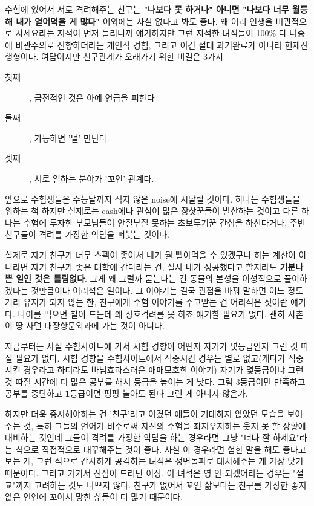 수험에 있어서 서로 격려해주는 친구는
\textbf{"나보다 못 하거나" 아니면 "나보다 너무 월등해 내가 얻어먹을 게 많다"} 이외에는 사실 없다고 봐도 좋다.
왜 이리 인생을 비관적으로 사세요라는 지적이 먼저 들리니까 얘기하지만
그런 지적한 녀석들이 100$\%$ 다 나중에 비관주의로 전향하더라는 개인적 경험, 그리고 이건 절대 과거완료가 아니라 현재진행형이다.
여담이지만 친구관계가 오래가기 위한 비결은 3가지
\begin{description}
    \item [첫째], 금전적인 것은 아예 언급을 피한다
    \item [둘째], 가능하면 '덜' 만난다.
    \item [셋째], 서로 일하는 분야가 '꼬인' 관계다.    
\end{description}
\vspace{5mm}

앞으로 수험생들은 수능날까지 적지 않은 noise에 시달릴 것이다.
하나는 수험생들을 위하는 척 하지만 실제로는 cash에나 관심이 많은 장삿꾼들이 발산하는 것이고
다른 하나는 수험에 투자한 부모님들이 안절부절 못하는 초보투기꾼 간섭을 하신다거나, 주변 친구들이 격려를 가장한 악담을 퍼붓는 것이다.
\vspace{5mm}

실제로 자기 친구가 너무 스펙이 좋아서 내가 뭘 빨아먹을 수 있겠구나 하는 계산이 아니라면
자기 친구가 좋은 대학에 간다라는 건, 설사 내가 성공했다고 할지라도 \textbf{기분나쁜 일인 것은 틀림없다}.
그게 왜 그럴까 묻는다는 건 동물의 본성을 이성적으로 풀이하겠다는 것만큼이나 어리석은 일이다.
그 이야기는 결국 관점을 바꿔 말하면 어느 정도 거리 유지가 되지 않는 한, 친구에게 수험 이야기를 주고받는 건 어리석은 짓이란 얘기다.
나이를 먹으면 철이 드는데 왜 상호격려를 못 하죠 얘기할 필요가 없다. 괜히 사촌이 땅 사면 대장항문외과에 가는 것이 아니다.
\vspace{5mm}

지금부터는 사실 수험사이트에 가서 시험 경향이 어떤지 자기가 몇등급인지 그런 것 따질 필요가 없다.
시험 경향을 수험사이트에서 적중시킨 경우는 별로 없고(게다가 적중시킨 경우라고 하더라도 바넘효과스러운 애매모호한 이야기)
자기가 몇등급이냐 그런 것 따질 시간에 더 많은 공부를 해서 등급을 높이는 게 낫다.
그럼 3등급이면 만족하고 공부를 중단하고 \textbf{1}등급이면 펑펑 놀아도 된다 그런 게 아니지 않은가.
\vspace{5mm}

하지만 더욱 중시해야하는 건 '친구'라고 여겼던 애들이 기대하지 않았던 모습을 보여주는 것,
특히 그들의 언어가 비수로써 자신의 수험을 좌지우지하는 웃지 못 할 상황에 대비하는 것인데
그들이 격려를 가장한 악담을 하는 경우라면 그냥 "너나 잘 하세요"라는 식으로 직접적으로 대꾸해주는 것이 좋다.
사실 이 경우라면 험한 말을 해도 좋다고 보는 게, 그런 식으로 간사하게 공격하는 녀석은 정면돌파로 대처해주는 게 가장 낫기 때문이다.
그리고 거기서 진심이 드러난 이상, 이 녀석은 영 안 되겠어라는 경우는 "절교"까지 고려하는 것도 나쁘지 않다.
친구가 없어서 꼬인 삶보다는 친구를 가장한 좋지 않은 인연에 꼬여서 망한 삶들이 더 많기 때문이다.
\vspace{5mm}

